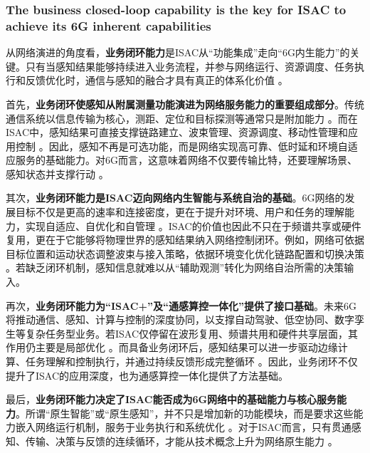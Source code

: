 \subsubsection{The business closed-loop capability is the key for ISAC to achieve its 6G inherent capabilities}
\label{subsubsec:ch1-isac-core value-closed loop-6g}

从网络演进的角度看，\textbf{业务闭环能力}是ISAC从“功能集成”走向“6G内生能力”的关键。只有当感知结果能够持续进入业务流程，并参与网络运行、资源调度、任务执行和反馈优化时，通信与感知的融合才具有真正的体系化价值 \cite{Liu2022ISAC,Zhang2021ISAC6G,Saad2020Vision6G}。

首先，\textbf{业务闭环使感知从附属测量功能演进为网络服务能力的重要组成部分}。传统通信系统以信息传输为核心，测距、定位和目标探测等通常只是附加能力 \cite{Sturm2011WaveformDesign}。而在ISAC中，感知结果可直接支撑链路建立、波束管理、资源调度、移动性管理和应用控制 \cite{Kaushik2024toward}。因此，感知不再是可选功能，而是网络实现高可靠、低时延和环境自适应服务的基础能力。对6G而言，这意味着网络不仅要传输比特，还要理解场景、感知状态并支撑行动 \cite{Saad2020Vision6G,Strinati20216G}。

其次，\textbf{业务闭环能力是ISAC迈向网络内生智能与系统自治的基础}。6G网络的发展目标不仅是更高的速率和连接密度，更在于提升对环境、用户和任务的理解能力，实现自适应、自优化和自管理 \cite{Saad2020Vision6G,Strinati20216G}。ISAC的价值也因此不只在于频谱共享或硬件复用，更在于它能够将物理世界的感知结果纳入网络控制闭环。例如，网络可依据目标位置和运动状态调整波束与接入策略，依据环境变化优化链路配置和切换决策 \cite{Liu2022ISAC,Zhang2021ISAC6G}。若缺乏闭环机制，感知信息就难以从“辅助观测”转化为网络自治所需的决策输入。

再次，\textbf{业务闭环能力为“ISAC+”及“通感算控一体化”提供了接口基础}。未来6G将推动通信、感知、计算与控制的深度协同，以支撑自动驾驶、低空协同、数字孪生等复杂任务型业务。若ISAC仅停留在波形复用、频谱共用和硬件共享层面，其作用仍主要是局部优化 \cite{Sturm2011WaveformDesign}。而具备业务闭环后，感知结果可以进一步驱动边缘计算、任务理解和控制执行，并通过持续反馈形成完整循环 \cite{Shi2016EdgeComputing,Chen2024integrated}。因此，业务闭环不仅提升了ISAC的应用深度，也为通感算控一体化提供了方法基础。

最后，\textbf{业务闭环能力决定了ISAC能否成为6G网络中的基础能力与核心服务能力}。所谓“原生智能”或“原生感知”，并不只是增加新的功能模块，而是要求这些能力嵌入网络运行机制，服务于业务执行和系统优化 \cite{Saad2020Vision6G,Strinati20216G}。对于ISAC而言，只有贯通感知、传输、决策与反馈的连续循环，才能从技术概念上升为网络原生能力 \cite{Liu2022ISAC,Kaushik2024toward}。


